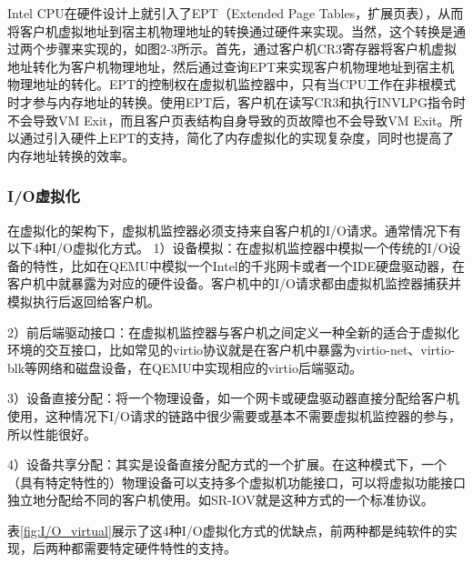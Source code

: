 Intel CPU在硬件设计上就引入了EPT（Extended Page Tables，扩展页表），从而将客户机虚拟地址到宿主机物理地址的转换通过硬件来实现。当然，这个转换是通过两个步骤来实现的，如图2-3所示。首先，通过客户机CR3寄存器将客户机虚拟地址转化为客户机物理地址，然后通过查询EPT来实现客户机物理地址到宿主机物理地址的转化。EPT的控制权在虚拟机监控器中，只有当CPU工作在非根模式时才参与内存地址的转换。使用EPT后，客户机在读写CR3和执行INVLPG指令时不会导致VM Exit，而且客户页表结构自身导致的页故障也不会导致VM Exit。所以通过引入硬件上EPT的支持，简化了内存虚拟化的实现复杂度，同时也提高了内存地址转换的效率。


\subsubsection{I/O虚拟化}
在虚拟化的架构下，虚拟机监控器必须支持来自客户机的I/O请求。通常情况下有以下4种I/O虚拟化方式。
1）设备模拟：在虚拟机监控器中模拟一个传统的I/O设备的特性，比如在QEMU中模拟一个Intel的千兆网卡或者一个IDE硬盘驱动器，在客户机中就暴露为对应的硬件设备。客户机中的I/O请求都由虚拟机监控器捕获并模拟执行后返回给客户机。

2）前后端驱动接口：在虚拟机监控器与客户机之间定义一种全新的适合于虚拟化环境的交互接口，比如常见的virtio协议就是在客户机中暴露为virtio-net、virtio-blk等网络和磁盘设备，在QEMU中实现相应的virtio后端驱动。

3）设备直接分配：将一个物理设备，如一个网卡或硬盘驱动器直接分配给客户机使用，这种情况下I/O请求的链路中很少需要或基本不需要虚拟机监控器的参与，所以性能很好。

4）设备共享分配：其实是设备直接分配方式的一个扩展。在这种模式下，一个（具有特定特性的）物理设备可以支持多个虚拟机功能接口，可以将虚拟功能接口独立地分配给不同的客户机使用。如SR-IOV就是这种方式的一个标准协议。

表\ref{fig:I/O_virtual}展示了这4种I/O虚拟化方式的优缺点，前两种都是纯软件的实现，后两种都需要特定硬件特性的支持。

